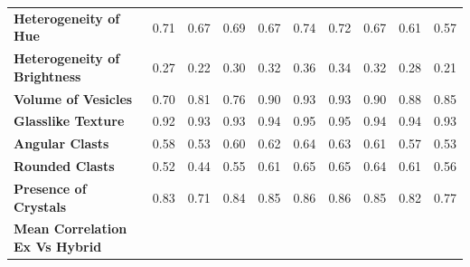 \begin{longtable}[c]{@{}llllllllll@{}}
\textbf{Heterogeneity of Hue} &
  \cellcolor[HTML]{F8CBAD}0.71 &
  \cellcolor[HTML]{C6E0B4}0.67 &
  \cellcolor[HTML]{FFE699}0.69 &
  \cellcolor[HTML]{B4C6E7}0.67 &
  \cellcolor[HTML]{FCE4D6}0.74 &
  \cellcolor[HTML]{E2EFDA}0.72 &
  \cellcolor[HTML]{FFF2CC}0.67 &
  \cellcolor[HTML]{DDEBF7}0.61 &
  \cellcolor[HTML]{D6DCE4}0.57 \\
\textbf{Heterogeneity of Brightness} &
  \cellcolor[HTML]{F8CBAD}0.27 &
  \cellcolor[HTML]{C6E0B4}0.22 &
  \cellcolor[HTML]{FFE699}0.30 &
  \cellcolor[HTML]{B4C6E7}0.32 &
  \cellcolor[HTML]{FCE4D6}0.36 &
  \cellcolor[HTML]{E2EFDA}0.34 &
  \cellcolor[HTML]{FFF2CC}0.32 &
  \cellcolor[HTML]{DDEBF7}0.28 &
  \cellcolor[HTML]{D6DCE4}0.21 \\
\textbf{Volume of Vesicles} &
  \cellcolor[HTML]{F8CBAD}0.70 &
  \cellcolor[HTML]{C6E0B4}0.81 &
  \cellcolor[HTML]{FFE699}0.76 &
  \cellcolor[HTML]{B4C6E7}0.90 &
  \cellcolor[HTML]{FCE4D6}0.93 &
  \cellcolor[HTML]{E2EFDA}0.93 &
  \cellcolor[HTML]{FFF2CC}0.90 &
  \cellcolor[HTML]{DDEBF7}0.88 &
  \cellcolor[HTML]{D6DCE4}0.85 \\
\textbf{Glasslike Texture} &
  \cellcolor[HTML]{F8CBAD}0.92 &
  \cellcolor[HTML]{C6E0B4}0.93 &
  \cellcolor[HTML]{FFE699}0.93 &
  \cellcolor[HTML]{B4C6E7}0.94 &
  \cellcolor[HTML]{FCE4D6}0.95 &
  \cellcolor[HTML]{E2EFDA}0.95 &
  \cellcolor[HTML]{FFF2CC}0.94 &
  \cellcolor[HTML]{DDEBF7}0.94 &
  \cellcolor[HTML]{D6DCE4}0.93 \\
\textbf{Angular Clasts} &
  \cellcolor[HTML]{F8CBAD}0.58 &
  \cellcolor[HTML]{C6E0B4}0.53 &
  \cellcolor[HTML]{FFE699}0.60 &
  \cellcolor[HTML]{B4C6E7}0.62 &
  \cellcolor[HTML]{FCE4D6}0.64 &
  \cellcolor[HTML]{E2EFDA}0.63 &
  \cellcolor[HTML]{FFF2CC}0.61 &
  \cellcolor[HTML]{DDEBF7}0.57 &
  \cellcolor[HTML]{D6DCE4}0.53 \\
\textbf{Rounded Clasts} &
  \cellcolor[HTML]{F8CBAD}0.52 &
  \cellcolor[HTML]{C6E0B4}0.44 &
  \cellcolor[HTML]{FFE699}0.55 &
  \cellcolor[HTML]{B4C6E7}0.61 &
  \cellcolor[HTML]{FCE4D6}0.65 &
  \cellcolor[HTML]{E2EFDA}0.65 &
  \cellcolor[HTML]{FFF2CC}0.64 &
  \cellcolor[HTML]{DDEBF7}0.61 &
  \cellcolor[HTML]{D6DCE4}0.56 \\
\textbf{Presence of Crystals} &
  \cellcolor[HTML]{F8CBAD}0.83 &
  \cellcolor[HTML]{C6E0B4}0.71 &
  \cellcolor[HTML]{FFE699}0.84 &
  \cellcolor[HTML]{B4C6E7}0.85 &
  \cellcolor[HTML]{FCE4D6}0.86 &
  \cellcolor[HTML]{E2EFDA}0.86 &
  \cellcolor[HTML]{FFF2CC}0.85 &
  \cellcolor[HTML]{DDEBF7}0.82 &
  \cellcolor[HTML]{D6DCE4}0.77 \\
\cellcolor[HTML]{FFFF00}\textbf{Mean Correlation Ex Vs Hybrid} &

\end{longtable}
